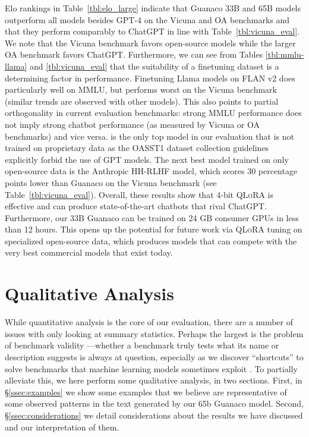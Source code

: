 Elo rankings in Table~\ref{tbl:elo_large} indicate that {Guanaco} 33B and 65B models outperform all models besides GPT-4 on the Vicuna and OA benchmarks and that they perform comparably to ChatGPT in line with Table~\ref{tbl:vicuna_eval}. We note that the Vicuna benchmark favors open-source models while the larger OA benchmark favors ChatGPT. Furthermore, we can see from Tables \ref{tbl:mmlu-llama} and \ref{tbl:vicuna_eval} that the suitability of a finetuning dataset is a determining factor in performance. Finetuning Llama models on FLAN v2 does particularly well on MMLU, but performs worst on the Vicuna benchmark (similar trends are observed with other models). This also points to partial orthogonality in current evaluation benchmarks: strong MMLU performance does not imply strong chatbot performance (as measured by Vicuna or OA benchmarks) and vice versa.
 is the only top model in our evaluation that is not trained on proprietary data as the OASST1 dataset collection guidelines explicitly forbid the use of GPT models. The next best model trained on only open-source data is the Anthropic HH-RLHF model, which scores 30 percentage points lower than {Guanaco} on the Vicuna benchmark (see Table~\ref{tbl:vicuna_eval}). Overall, these results show that 4-bit \textsc{QLoRA} is effective and can produce state-of-the-art chatbots that rival ChatGPT. Furthermore, our 33B {Guanaco} can be trained on 24 GB consumer GPUs in less than 12 hours. This opens up the potential for future work via \textsc{QLoRA} tuning on specialized open-source data, which produces models that can compete with the very best commercial models that exist today. 

\section{Qualitative Analysis}

While quantitative analysis is the core of our evaluation, there are a number of issues with only looking at summary statistics. Perhaps the largest is the problem of benchmark validity \citep{liao2021we}—whether a benchmark truly tests what its name or description suggests is always at question, especially as we discover ``shortcuts'' to solve benchmarks that machine learning models sometimes exploit \citep{gururangan2018annotation, poliak2018hypothesis}. To partially alleviate this, we here perform some qualitative analysis, in two sections. First, in \S\ref{ssec:examples} we show some examples that we believe are representative of some observed patterns in the text generated by our 65b {Guanaco} model. Second, \S\ref{ssec:considerations} we detail considerations about the results we have discussed and our interpretation of them.

